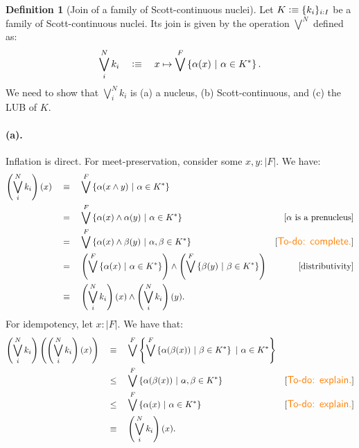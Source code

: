 \documentclass[a4paper, 11pt]{article}
\theoremstyle{definition}
\newtheorem{defn}{Definition}
\newcommand{\paren}[1]{\left( #1 \right)}
\newcommand{\setof}[1]{\left\{ #1 \right\}}
\newcommand{\is}{\vcentcolon\equiv}
\newcommand{\todo}[1]{{\large\color{orange}\textsf{To-do: #1.}}}
\begin{document}
\begin{defn}[Join of a family of Scott-continuous nuclei]
  Let $K \is \{ k_i \}_{i : I}$ be a family of Scott-continuous nuclei. Its join is given by
  the operation $\bigvee^N$ defined as:
  \begin{equation*}
    \bigvee^N_{i} k_i \quad\is\quad x \mapsto \bigvee^F \left\{ \alpha(x) ~|~ \alpha \in K^* \right\}.
  \end{equation*}
  We need to show that $\bigvee^N_{i} k_i$ is
    (a) a nucleus,
    (b) Scott-continuous, and
    (c) the LUB of $K$.

  \paragraph{(a).} Inflation is direct. For meet-preservation, consider some $x, y : | F |$. We have:
  \begin{align*}
    \left(\bigvee^N_{i} k_i\right)(x)
    &\quad\equiv\quad \bigvee^F \left\{ \alpha(x \wedge y) ~|~ \alpha \in K^* \right\} \\
    &\quad=\quad \bigvee^F \left\{ \alpha(x) \wedge \alpha(y) ~|~ \alpha \in K^* \right\}
          & [\text{$\alpha$ is a prenucleus}] \\
    &\quad=\quad \bigvee^F \left\{ \alpha(x) \wedge \beta(y) ~|~ \alpha, \beta \in K^* \right\}
          & [\text{\todo{complete}}] \\
    &\quad=\quad \paren{\bigvee^F \setof{ \alpha(x) ~|~ \alpha \in K^* }} \wedge \paren{\bigvee^F \setof{ \beta(y) ~|~ \beta \in K^* }}
          & [\text{distributivity}] \\
    &\quad\equiv\quad \paren{\bigvee^N_i k_i}(x) \wedge \paren{\bigvee^N_i k_i}(y).
  \end{align*}
  For idempotency, let $x : | F |$. We have that:
  \begin{align*}
    \left(\bigvee^N_{i} k_i\right)\left(\left(\bigvee^N_{i} k_i\right)(x)\right)
    &\quad\equiv\quad \bigvee^F \setof{ \bigvee^F \setof{ \alpha(\beta(x)) ~|~ \beta \in K^* } ~|~ \alpha \in K^* } \\
    &\quad\le\quad \bigvee^F \setof{ \alpha(\beta(x)) ~|~ \alpha, \beta \in K^* } & [\text{\todo{explain}}]\\
    &\quad\le\quad \bigvee^F \setof{ \alpha(x) ~|~ \alpha \in K^* } & [\text{\todo{explain}}]\\
    &\quad\equiv\quad \paren{\bigvee^N_i k_i}(x).
  \end{align*}


\end{defn}
\end{document}
